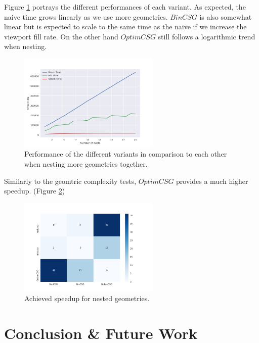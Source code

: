 \documentclass[a4paper,11pt,oneside]{article}
\begin{document}
Figure \ref{sec5.2:test_nesting} portrays the different performances of each variant. As expected, the naive time grows linearly as we use more geometries. $BinCSG$ is also somewhat linear but is expected to scale to the same time as the naive if we increase the viewport fill rate. On the other hand $OptimCSG$ still follows a logarithmic trend when nesting. 

\begin{figure}[H]
	\centering
	\includegraphics[width=0.6\textwidth]{section5/plots/test_nesting.png}
	\caption{Performance of the different variants in comparison to each other when nesting more geometries together.}
	\label{sec5.2:test_nesting}
\end{figure}

Similarly to the geomtric complexity tests, $OptimCSG$ provides a much higher speedup. (Figure \ref{sec5.1:heatmap_nesting})

\begin{figure}[H]
	\centering
	\includegraphics[width=0.6\textwidth]{section5/plots/nesting_speedup.png}
	\caption{Achieved speedup for nested geometries.}
	\label{sec5.1:heatmap_nesting}
\end{figure}


\section{Conclusion \& Future Work}
\end{document}
